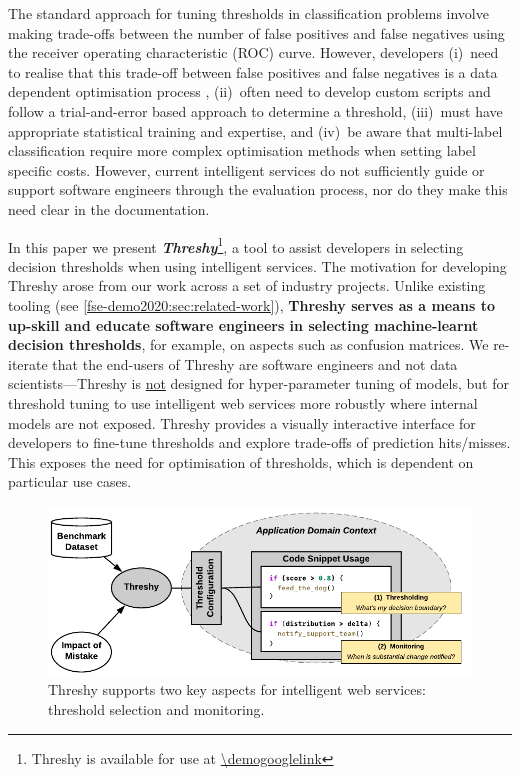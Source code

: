 The standard approach for tuning thresholds in classification problems involve making trade-offs between the number of false positives and false negatives using the receiver operating characteristic (ROC) curve. However, developers (i)~need to realise that this trade-off between false positives and false negatives is a data dependent optimisation process \citep{sculley2011detecting}, (ii)~often need to develop custom scripts and follow a trial-and-error based approach to determine a threshold, (iii)~must have appropriate statistical training and expertise, and (iv)~be aware that multi-label classification require more complex optimisation methods when setting label specific costs. However, current intelligent services do not sufficiently guide or support software engineers through the evaluation process, nor do they make this need clear in the documentation. 

In this paper we present \textit{\bfseries Threshy}\footnote{Threshy is available for use at \url{\demogooglelink}}, a tool to assist developers in selecting decision thresholds when using intelligent services. The motivation for developing Threshy arose from our work across a set of industry projects. Unlike existing tooling (see \cref{fse-demo2020:sec:related-work}), \textbf{Threshy serves as a means to up-skill and educate software engineers in selecting machine-learnt decision thresholds}, for example, on aspects such as confusion matrices. We re-iterate that the end-users of Threshy are software engineers and not data scientists---Threshy is \uline{not} designed for hyper-parameter tuning of models, but for threshold tuning to use intelligent web services more robustly where internal models are not exposed.%
Threshy provides a visually interactive interface for developers to fine-tune thresholds and explore trade-offs of prediction hits/misses. This exposes the need for optimisation of thresholds, which is dependent on particular use cases.

\begin{figure}
    \centering
    \includegraphics[width=.9\linewidth]{usage-thresholding-monitoring.pdf}
    \caption[Threshy supports threshold selection and monitoring]{Threshy supports two key aspects for intelligent web services: threshold selection and monitoring.}
    \label{fse-demo2020:fig:usage-thresholding-monitoring}
\end{figure}

